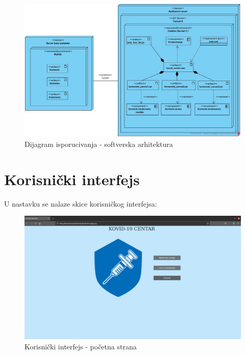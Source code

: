 \documentclass[titlepage]{article}
\begin{document}
\begin{figure}[H]
\centering
\includegraphics[scale=0.4]{DijagramIsporucivanja}
\caption{Dijagram isporucivanja - softverska arhitektura}
\label{slk:isporucivanje}
\end{figure}

\section{Korisni\v{c}ki interfejs}

U nastavku se nalaze skice korisni\v{c}kog interfejsa:

\begin{figure}[H]
\centering
\includegraphics[scale=0.23]{pocetna}
\caption{Korisni\v{c}ki interfejs - početna strana}
\label{slk:komponente}
\end{figure}
\end{document}
